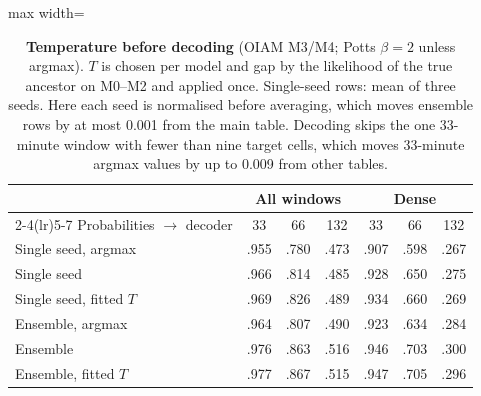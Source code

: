 \begin{table}[t]
\centering\small
\setlength{\tabcolsep}{4pt}
\begin{adjustbox}{max width=\linewidth}
\begin{tabular}{lcccccc}
\toprule
& \multicolumn{3}{c}{All windows} & \multicolumn{3}{c}{Dense} \\
\cmidrule(lr){2-4}\cmidrule(lr){5-7}
Probabilities $\to$ decoder & 33 & 66 & 132 & 33 & 66 & 132 \\
\midrule
Single seed, argmax & .955 & .780 & .473 & .907 & .598 & .267 \\
Single seed & .966 & .814 & .485 & .928 & .650 & .275 \\
Single seed, fitted $T$ & .969 & .826 & .489 & .934 & .660 & .269 \\
Ensemble, argmax & .964 & .807 & .490 & .923 & .634 & .284 \\
Ensemble & .976 & .863 & .516 & .946 & .703 & .300 \\
Ensemble, fitted $T$ & .977 & .867 & .515 & .947 & .705 & .296 \\
\bottomrule
\end{tabular}
\end{adjustbox}
\caption{\textbf{Temperature before decoding} (OIAM M3/M4; Potts $\beta{=}2$ unless argmax). $T$ is chosen per model and gap by the likelihood of the true ancestor on M0--M2 and applied once. Single-seed rows: mean of three seeds. Here each seed is normalised before averaging, which moves ensemble rows by at most 0.001 from the main table. Decoding skips the one 33-minute window with fewer than nine target cells, which moves 33-minute argmax values by up to 0.009 from other tables.}
\label{tab:temperature}
\end{table}
